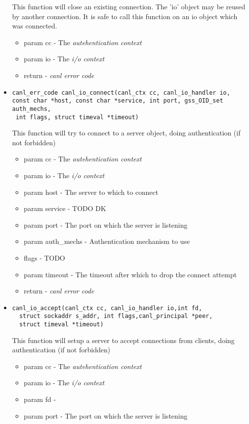 \begin{itemize}
  This function will close an existing connection.  The 'io' object may 
  be reused by another connection. It is safe to call this 
  function on an io object which was connected.
  \begin{itemize}
    \item param cc - The \textit{autehentication context}
    \item param io - The \textit{i/o context}
    \item return - \textit{canl error code}
  \end{itemize}
  \item \begin{verbatim}canl_err_code canl_io_connect(canl_ctx cc, canl_io_handler io, 
const char *host, const char *service, int port, gss_OID_set auth_mechs,
 int flags, struct timeval *timeout)\end{verbatim}
  This function will try to connect to a server object, 
  doing authentication (if not forbidden)
  \begin{itemize}
    \item param cc - The \textit{autehentication context}
    \item param io - The \textit{i/o context}
    \item param host - The server to which to connect
    \item param service - TODO DK
    \item param port - The port on which the server is listening
    \item param auth\_mechs - Authentication mechanism to use
    \item flags - TODO
    \item param timeout - The timeout after which to drop the connect attempt
    \item return - \textit{canl error code}
  \end{itemize}
  \item \begin{verbatim}canl_io_accept(canl_ctx cc, canl_io_handler io,int fd,
  struct sockaddr s_addr, int flags,canl_principal *peer,
  struct timeval *timeout)\end{verbatim}
  This function will 
  setup a server to accept connections from clients, doing 
  authentication (if not forbidden)
  \begin{itemize}
    \item param cc - The \textit{autehentication context}
    \item param io - The \textit{i/o context}
    \item param fd - \TODO
    \item param port - The port on which the server is listening
  \end{itemize}

\end{itemize}


